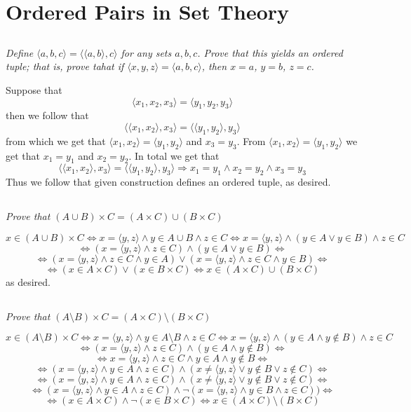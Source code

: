 \documentclass[11pt,oneside,titlepage]{book}
\DeclareMathOperator \lra {\Leftrightarrow}
\DeclareMathOperator \imp {\Rightarrow}
\newcommand{\eangle}[1]{\langle #1 \rangle}
\begin{document}
\section{Ordered Pairs in Set Theory}

\subsection{}

\textit{Define $\eangle{a, b, c} = \eangle{\eangle{a, b}, c}$ for any sets $a, b, c$. Prove that this yields an
  ordered tuple; that is, prove tahat if $\eangle{x, y, z} = \eangle{a, b, c}$, then $x = a$, $y = b$, $z = c$.}

Suppose that
$$\eangle{x_1, x_2, x_3} = \eangle{y_1, y_2, y_3}$$
then we follow that
$$\eangle{\eangle{x_1, x_2}, x_3} = \eangle{\eangle{y_1, y_2}, y_3}$$
from which we get that $\eangle{x_1, x_2} = \eangle{y_1, y_2}$ and $x_3 = y_3$. From
$\eangle{x_1, x_2} = \eangle{y_1, y_2}$ we get that $x_1  = y_1$ and $x_2 = y_2$. In
total we get that
$$\eangle{\eangle{x_1, x_2}, x_3} = \eangle{\eangle{y_1, y_2}, y_3}
\imp x_1 = y_1 \land x_2 = y_2 \land x_3 = y_3$$
Thus we follow that given construction defines an ordered tuple, as desired.

\subsection{}

\textit{Prove that $(A \cup B) \times C = (A \times C) \cup (B \times C)$}

$$x \in (A \cup B) \times C \lra x = \eangle{y, z} \land y \in A \cup B \land z \in C
\lra  x = \eangle{y, z} \land (y \in A \lor y \in  B) \land z \in C $$
$$ \lra  (x = \eangle{y, z} \land z \in C ) \land (y \in A \lor y \in  B) \lra $$
$$\lra 
(x = \eangle{y, z} \land z \in C \land y \in A ) \lor
(x = \eangle{y, z} \land z \in C \land y \in B ) \lra$$
$$\lra 
(x \in A \times C ) \lor (x \in B \times C) \lra x \in (A \times C) \cup (B \times C)$$
as desired.

\subsection{}

\textit{Prove that $(A \setminus B) \times C = (A \times C) \setminus (B \times C)$}

$$x \in (A \setminus B) \times C \lra x = \eangle{y, z} \land y \in A \setminus B \land z \in C
\lra  x = \eangle{y, z} \land (y \in A \land y \notin  B) \land z \in C $$
$$ \lra  (x = \eangle{y, z} \land z \in C ) \land (y \in A \land y \notin  B) \lra $$
$$ \lra  x = \eangle{y, z} \land z \in C \land y \in A \land y \notin  B \lra $$
$$ \lra  (x = \eangle{y, z} \land y \in A \land z \in C) \land
 (x \neq \eangle{y, z} \lor y \notin B \lor z \notin C)  \lra $$
$$ \lra  (x = \eangle{y, z} \land y \in A \land z \in C) \land
 (x \neq \eangle{y, z} \lor y \notin B \lor z \notin C)  \lra $$
$$ \lra  (x = \eangle{y, z} \land y \in A \land z \in C) \land
\neg (x = \eangle{y, z} \land y \in B \land z \in C))  \lra $$
$$\lra 
(x \in A \times C) \land \neg (x \in B \times C) \lra x \in (A \times C) \setminus (B \times C)$$
\end{document}
